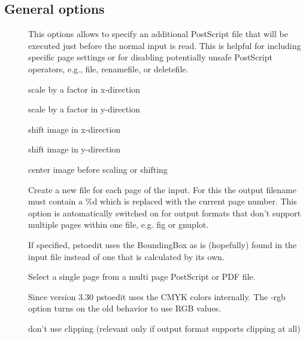 \documentclass[english,a4paper]{article}
\begin{document}
\subsection{General options}
\begin{description}
\item[] 
This options allows to specify an additional PostScript file that will be executed just before the normal input is read. This is helpful for including specific page settings or for disabling potentially unsafe PostScript operators, e.g., file, renamefile, or deletefile. 


\item[] 
scale by a factor in x-direction


\item[] 
scale by a factor in y-direction


\item[] 
shift image in x-direction


\item[] 
shift image in y-direction


\item[] 
center image before scaling or shifting


\item[] 
Create a new file for each page of the input. For this the output filename must contain a \%d which is replaced with the current page number. This option is automatically switched on for output formats that don't support multiple pages within one file, e.g. fig or gnuplot. 


\item[] 
If specified, pstoedit uses the BoundingBox as is (hopefully) found in the input file instead of one that is calculated by its own. 


\item[] 
Select a single page from a multi page PostScript or PDF file. 


\item[] 
Since version 3.30 pstoedit uses the CMYK colors internally. The -rgb option turns on the old behavior to use RGB values.


\item[] 
don't use clipping (relevant only if output format supports clipping at all)



\end{description}
\end{document}

